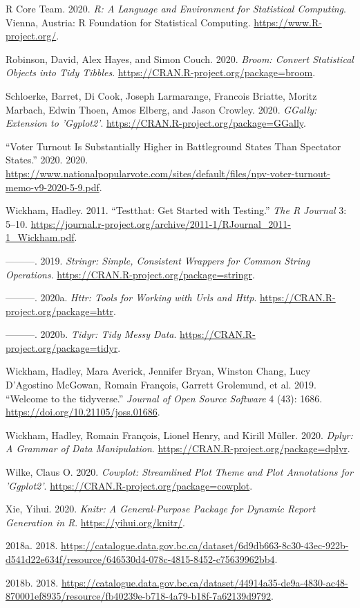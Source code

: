 \documentclass[
]{article}
\begin{document}
\leavevmode\hypertarget{ref-R}{}%
R Core Team. 2020. \emph{R: A Language and Environment for Statistical
Computing}. Vienna, Austria: R Foundation for Statistical Computing.
\url{https://www.R-project.org/}.

\leavevmode\hypertarget{ref-broom}{}%
Robinson, David, Alex Hayes, and Simon Couch. 2020. \emph{Broom: Convert
Statistical Objects into Tidy Tibbles}.
\url{https://CRAN.R-project.org/package=broom}.

\leavevmode\hypertarget{ref-GGally}{}%
Schloerke, Barret, Di Cook, Joseph Larmarange, Francois Briatte, Moritz
Marbach, Edwin Thoen, Amos Elberg, and Jason Crowley. 2020.
\emph{GGally: Extension to 'Ggplot2'}.
\url{https://CRAN.R-project.org/package=GGally}.

\leavevmode\hypertarget{ref-US_voter_turnout}{}%
``Voter Turnout Is Substantially Higher in Battleground States Than
Spectator States.'' 2020. 2020.
\url{https://www.nationalpopularvote.com/sites/default/files/npv-voter-turnout-memo-v9-2020-5-9.pdf}.

\leavevmode\hypertarget{ref-testthat}{}%
Wickham, Hadley. 2011. ``Testthat: Get Started with Testing.'' \emph{The
R Journal} 3: 5--10.
\url{https://journal.r-project.org/archive/2011-1/RJournal_2011-1_Wickham.pdf}.

\leavevmode\hypertarget{ref-stringr}{}%
---------. 2019. \emph{Stringr: Simple, Consistent Wrappers for Common
String Operations}. \url{https://CRAN.R-project.org/package=stringr}.

\leavevmode\hypertarget{ref-httr}{}%
---------. 2020a. \emph{Httr: Tools for Working with Urls and Http}.
\url{https://CRAN.R-project.org/package=httr}.

\leavevmode\hypertarget{ref-tidyr}{}%
---------. 2020b. \emph{Tidyr: Tidy Messy Data}.
\url{https://CRAN.R-project.org/package=tidyr}.

\leavevmode\hypertarget{ref-tidyverse}{}%
Wickham, Hadley, Mara Averick, Jennifer Bryan, Winston Chang, Lucy
D'Agostino McGowan, Romain François, Garrett Grolemund, et al. 2019.
``Welcome to the tidyverse.'' \emph{Journal of Open Source Software} 4
(43): 1686. \url{https://doi.org/10.21105/joss.01686}.

\leavevmode\hypertarget{ref-dplyr}{}%
Wickham, Hadley, Romain François, Lionel Henry, and Kirill Müller. 2020.
\emph{Dplyr: A Grammar of Data Manipulation}.
\url{https://CRAN.R-project.org/package=dplyr}.

\leavevmode\hypertarget{ref-cowplot}{}%
Wilke, Claus O. 2020. \emph{Cowplot: Streamlined Plot Theme and Plot
Annotations for 'Ggplot2'}.
\url{https://CRAN.R-project.org/package=cowplot}.

\leavevmode\hypertarget{ref-knitr}{}%
Xie, Yihui. 2020. \emph{Knitr: A General-Purpose Package for Dynamic
Report Generation in R}. \url{https://yihui.org/knitr/}.

\leavevmode\hypertarget{ref-pvp}{}%
2018a. 2018.
\url{https://catalogue.data.gov.bc.ca/dataset/6d9db663-8c30-43ec-922b-d541d22e634f/resource/646530d4-078c-4815-8452-c75639962bb4}.

\leavevmode\hypertarget{ref-pvr}{}%
2018b. 2018.
\url{https://catalogue.data.gov.bc.ca/dataset/44914a35-de9a-4830-ac48-870001ef8935/resource/fb40239e-b718-4a79-b18f-7a62139d9792}.
\end{document}
